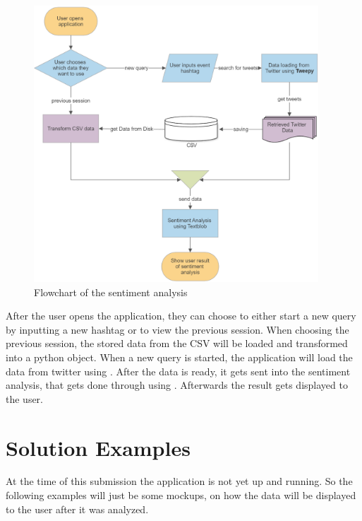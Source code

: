 \documentclass[a4paper,oneside,11pt]{scrreprt}
\begin{document}
\begin{figure}[h]
    \centering
    \caption{Flowchart of the sentiment analysis}
    \includegraphics[width=0.95\textwidth]{media/sentiment_analysis_flowchart.png}
\end{figure}

After the user opens the application, they can choose to either start a new query by inputting a new hashtag or to view the previous session. When choosing the previous session, the stored data from the CSV will be loaded and transformed into a python object. When a new query is started, the application will load the data from twitter using . After the data is ready, it gets sent into the sentiment analysis, that gets done through using . Afterwards the result gets displayed to the user.


\chapter{Solution Examples}
At the time of this submission the application is not yet up and running. So the following examples will just be some mockups, on how the data will be displayed to the user after it was analyzed.
\end{document}
